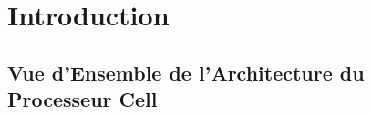 \documentclass[11pt]{report}
\begin{document}
\section{Introduction}
\subsection{Vue d'Ensemble de l'Architecture du Processeur Cell}

\end{document}
